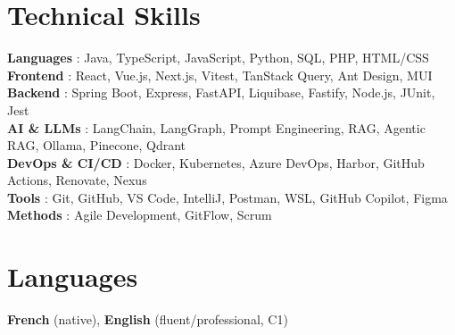 \documentclass[letterpaper,11pt]{article}
\begin{document}
\section{Technical Skills}
    \begin{itemize}[leftmargin=0.15in, label={}]
        \small{\item{
            \textbf{Languages} : Java, TypeScript, JavaScript, Python, SQL, PHP, HTML/CSS \\
            \textbf{Frontend} : React, Vue.js, Next.js, Vitest, TanStack Query, Ant Design, MUI \\
            \textbf{Backend} : Spring Boot, Express, FastAPI, Liquibase, Fastify, Node.js, JUnit, Jest \\
            \textbf{AI \& LLMs} : LangChain, LangGraph, Prompt Engineering, RAG, Agentic RAG, Ollama, Pinecone, Qdrant \\
            \textbf{DevOps \& CI/CD} : Docker, Kubernetes, Azure DevOps, Harbor, GitHub Actions, Renovate, Nexus \\
            \textbf{Tools} : Git, GitHub, VS Code, IntelliJ, Postman, WSL, GitHub Copilot, Figma \\
            \textbf{Methods} : Agile Development, GitFlow, Scrum
        }}
    \end{itemize}

\section{Languages}
    \textbf{French} (native), \textbf{English} (fluent/professional, C1)

\end{document}
